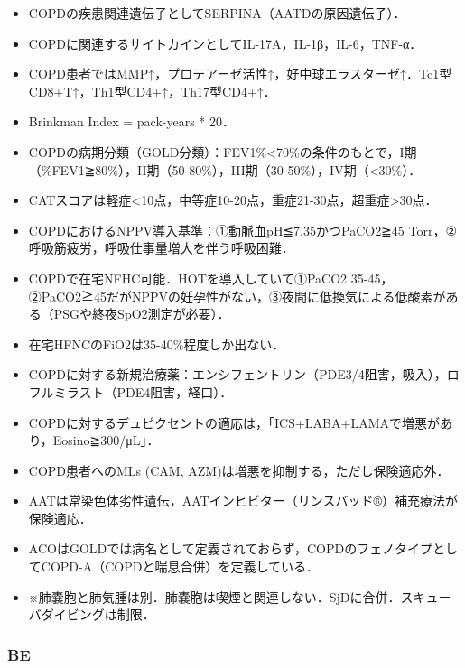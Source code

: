\begin{itemize}
\item COPDの疾患関連遺伝子としてSERPINA（AATDの原因遺伝子）．
\item COPDに関連するサイトカインとしてIL-17A，IL-1β，IL-6，TNF-α．
\item COPD患者ではMMP↑，プロテアーゼ活性↑，好中球エラスターゼ↑．Tc1型CD8+T↑，Th1型CD4+↑，Th17型CD4+↑．
\item Brinkman Index = pack-years * 20．
\item COPDの病期分類（GOLD分類）：FEV1\%<70\%の条件のもとで，I期（\%FEV1≧80\%），II期（50-80\%），III期（30-50\%），IV期（<30\%）．
\item CATスコアは軽症<10点，中等症10-20点，重症21-30点，超重症>30点．


\item COPDにおけるNPPV導入基準：①動脈血pH≦7.35かつPaCO2≧45 Torr，②呼吸筋疲労，呼吸仕事量増大を伴う呼吸困難．
\item COPDで在宅NFHC可能．HOTを導入していて①PaCO2 35-45，②PaCO2≧45だがNPPVの妊孕性がない，③夜間に低換気による低酸素がある（PSGや終夜SpO2測定が必要）．
\item 在宅HFNCのFiO2は35-40\%程度しか出ない．
\item COPDに対する新規治療薬：エンシフェントリン（PDE3/4阻害，吸入），ロフルミラスト（PDE4阻害，経口）．
\item COPDに対するデュピクセントの適応は，「ICS+LABA+LAMAで増悪があり，Eosino≧300/μL」．
\item COPD患者へのMLs (CAM, AZM)は増悪を抑制する，ただし保険適応外．
\item AATは常染色体劣性遺伝，AATインヒビター（リンスバッド®）補充療法が保険適応．
\item ACOはGOLDでは病名として定義されておらず，COPDのフェノタイプとしてCOPD-A（COPDと喘息合併）を定義している．
\item ※肺嚢胞と肺気腫は別．肺嚢胞は喫煙と関連しない．SjDに合併．スキューバダイビングは制限．

\end{itemize}

\subsubsection{BE}

